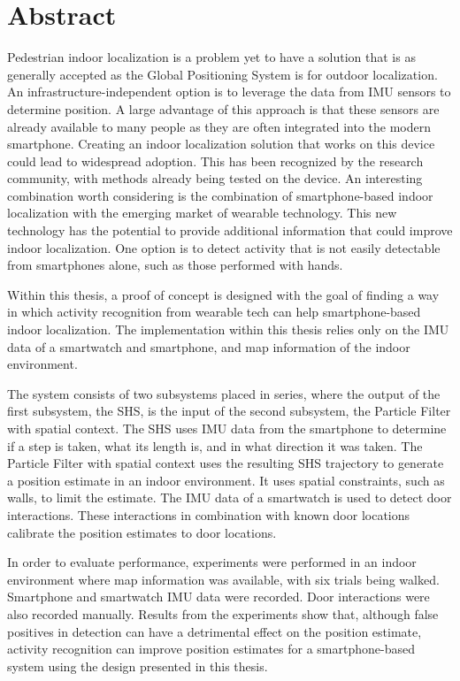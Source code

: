 %
\chapter*{Abstract}%

Pedestrian indoor localization is a problem yet to have a solution that is as generally accepted as the Global Positioning System is for outdoor localization. An infrastructure-independent option is to leverage the data from \ac{IMU} sensors to determine position. A large advantage of this approach is that these sensors are already available to many people as they are often integrated into the modern smartphone. Creating an indoor localization solution that works on this device could lead to widespread adoption. This has been recognized by the research community, with methods already being tested on the device. An interesting combination worth considering is the combination of smartphone-based indoor localization with the emerging market of wearable technology. This new technology has the potential to provide additional information that could improve indoor localization. One option is to detect activity that is not easily detectable from smartphones alone, such as those performed with hands.

Within this thesis, a proof of concept is designed with the goal of finding a way in which activity recognition from wearable tech can help smartphone-based indoor localization.
The implementation within this thesis relies only on the \ac{IMU} data of a smartwatch and smartphone, and map information of the indoor environment.  \par 

The system consists of two subsystems placed in series, where the output of the first subsystem, the \ac{SHS}, is the input of the second subsystem, the Particle Filter with spatial context. The \ac{SHS} uses \ac{IMU} data from the smartphone to determine if a step is taken, what its length is, and in what direction it was taken. 
The Particle Filter with spatial context uses the resulting \ac{SHS} trajectory to generate a position estimate in an indoor environment. It uses spatial constraints, such as walls, to limit the estimate. The \ac{IMU} data of a smartwatch is used to detect door interactions. These interactions in combination with known door locations calibrate the position estimates to door locations. \par 

In order to evaluate performance, experiments were performed in an indoor environment where map information was available, with six trials being walked. Smartphone and smartwatch {IMU} data were recorded. Door interactions were also recorded manually.
Results from the experiments show that, although false positives in detection can have a detrimental effect on the position estimate, activity recognition can improve position estimates for a smartphone-based system using the design presented in this thesis.

